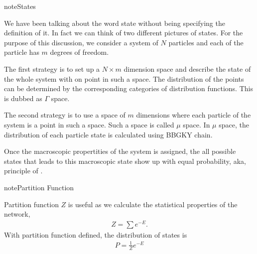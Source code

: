 \documentclass[letterpaper,10pt,english]{sphinxmanual}
\begin{document}
\begin{sphinxadmonition}{note}{States}

We have been talking about the word state without being specifying the definition of it. In fact we can think of two different pictures of states. For the purpose of this discussion, we consider a system of \(N\) particles and each of the particle has \(m\) degrees of freedom.

The first strategy is to set up a \(N\times m\) dimension space and describe the state of the whole system with on point in such a space. The distribution of the points can be determined by the corresponding categories of distribution functions. This is dubbed as \(\Gamma\) space.

The second strategy is to use a space of \(m\) dimensions where each particle of the system is a point in such a space. Such a space is called \(\mu\) space. In \(\mu\) space, the distribution of each particle state is calculated using BBGKY chain.

Once the macroscopic propertities of the system is assigned, the all possible states that leads to this macroscopic state show up with equal probability, aka, principle of .
\end{sphinxadmonition}

\begin{sphinxadmonition}{note}{Partition Function}

Partition function \(Z\) is useful as we calculate the statistical properties of the network,
\begin{equation*}
\begin{split}Z = \sum e^{-E}.\end{split}
\end{equation*}
With partition function defined, the distribution of states is
\begin{equation*}
\begin{split}P = \frac{1}{Z} e^{-E}\end{split}
\end{equation*}\end{sphinxadmonition}
\end{document}
